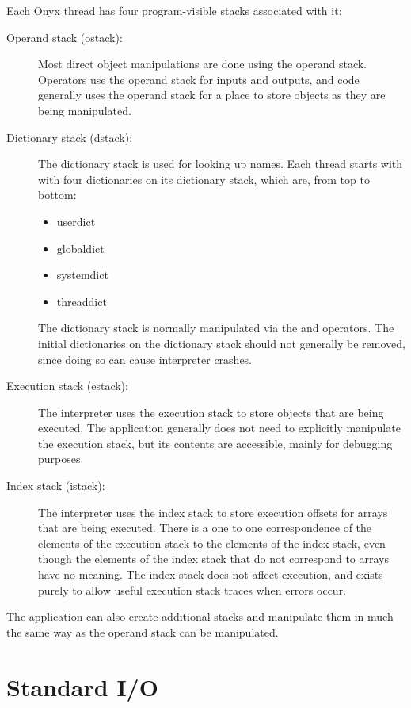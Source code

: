 Each Onyx thread has four program-visible stacks associated with it:
\begin{description}
\item[Operand stack (ostack): ] Most direct object manipulations are done using
	the operand stack.  Operators use the operand stack for inputs and
	outputs, and code generally uses the operand stack for a place to store
	objects as they are being manipulated.
\item[Dictionary stack (dstack): ] The dictionary stack is used for looking up
	names.  Each thread starts with with four dictionaries on its dictionary
	stack, which are, from top to bottom:
	\begin{itemize}
		\item{userdict}
		\item{globaldict}
		\item{systemdict}
		\item{threaddict}
	\end{itemize}
	The dictionary stack is normally manipulated via the
	 and
	 operators.  The initial
	dictionaries on the dictionary stack should not generally be removed,
	since doing so can cause interpreter crashes.
\item[Execution stack (estack): ] The interpreter uses the execution stack to
	store objects that are being executed.  The application generally does
	not need to explicitly manipulate the execution stack, but its contents
	are accessible, mainly for debugging purposes.
\item[Index stack (istack): ] The interpreter uses the index stack to store
	execution offsets for arrays that are being executed.  There is a one to
	one correspondence of the elements of the execution stack to the
	elements of the index stack, even though the elements of the index stack
	that do not correspond to arrays have no meaning.  The index stack does
	not affect execution, and exists purely to allow useful execution stack
	traces when errors occur.
\end{description}

The application can also create additional stacks and manipulate them in much
the same way as the operand stack can be manipulated.

\section{Standard I/O}
\label{sec:onyx_standard_io}

